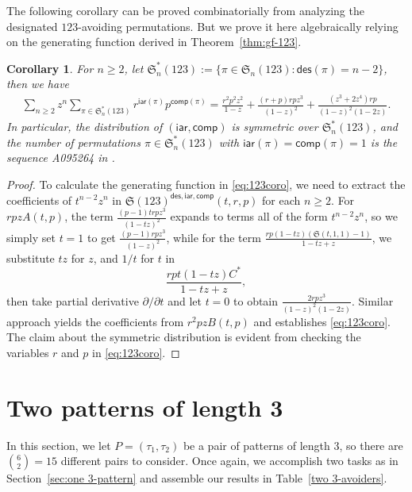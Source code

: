 \documentclass[12pt]{amsart}
\numberwithin{equation}{section}
\theoremstyle{plain}
\newtheorem{corollary}[theorem]{Corollary}
\theoremstyle{definition}
\def\des{\mathsf{des}}
\def\S{\mathfrak{S}}
\def\iar{\mathsf{iar}}
\def\comp{\mathsf{comp}}
\begin{document}
The following corollary can be proved combinatorially from analyzing the designated $123$-avoiding permutations. But we prove it here algebraically relying on the generating function derived in Theorem~\ref{thm:gf-123}.
\begin{corollary}
For $n\ge 2$, let $\S_n^{*}(123):=\{\pi\in\S_n(123):\des(\pi)=n-2\}$, then we have
\begin{align}\label{eq:123coro}
\sum_{n\ge 2}z^n\sum_{\pi\in\S_n^*(123)}r^{\iar(\pi)}p^{\comp(\pi)}=\frac{r^2p^2z^2}{1-z}+\frac{(r+p)rpz^3}{(1-z)^2}+\frac{(z^3+2z^4)rp}{(1-z)^2(1-2z)}.
\end{align}
In particular, the distribution of $(\iar,\comp)$ is symmetric over $\S_n^*(123)$, and the number of permutations $\pi\in\S_n^*(123)$ with $\iar(\pi)=\comp(\pi)=1$ is the sequence A095264 in \cite{oeis}.
\end{corollary}
\begin{proof}
To calculate the generating function in \eqref{eq:123coro}, we need to extract the coefficients of $t^{n-2}z^n$ in $\S(123)^{\des,\iar,\comp}(t,r,p)$ for each $n\ge 2$. For $rpzA(t,p)$, the term $\frac{(p-1)trpz^3}{(1-tz)^2}$ expands to terms all of the form $t^{n-2}z^n$, so we simply set $t=1$ to get $\frac{(p-1)rpz^3}{(1-z)^2}$, while for the term $\frac{rp(1-tz)(\S(t,1,1)-1)}{1-tz+z}$, we substitute $tz$ for $z$, and $1/t$ for $t$ in
$$\frac{rpt(1-tz) C^*}{1-tz+z},$$
then take partial derivative $\partial/\partial t$ and let $t=0$ to obtain $\frac{2rpz^3}{(1-z)^2(1-2z)}$. Similar approach yields the coefficients from $r^2pzB(t,p)$ and establishes \eqref{eq:123coro}. The claim about the symmetric distribution is evident from checking the variables $r$ and $p$ in \eqref{eq:123coro}.
\end{proof}



\section{Two patterns of length 3}\label{sec3: two 3-patterns}

In this section, we let $P=(\tau_1,\tau_2)$ be a pair of patterns of length $3$, so there are $\binom{6}{2}=15$ different pairs to consider. Once again, we accomplish two tasks as in Section~\ref{sec:one 3-pattern} and assemble our results in Table~\ref{two 3-avoiders}.
\end{document}
